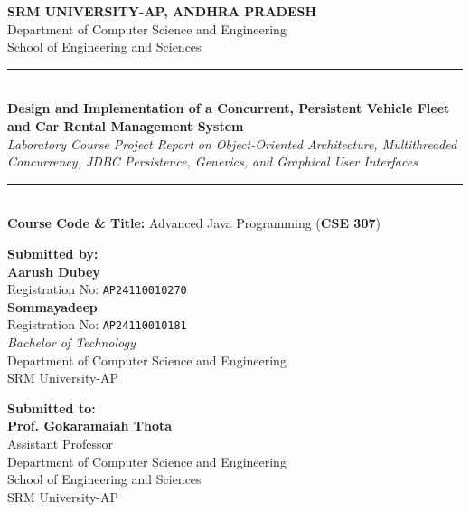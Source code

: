 \documentclass[11pt,a4paper]{article}
\begin{document}
\begin{titlepage}
    \centering
    \vspace*{0.5cm}
    
    {\Large\textbf{SRM UNIVERSITY-AP, ANDHRA PRADESH}}\\[0.25cm]
    {\large Department of Computer Science and Engineering}\\[0.15cm]
    {\small School of Engineering and Sciences}\\[1.2cm]
    
    \rule{\linewidth}{1.2pt}\\[0.4cm]
    {\LARGE\textbf{Design and Implementation of a Concurrent, Persistent Vehicle Fleet and Car Rental Management System}}\\[0.35cm]
    {\large\textit{Laboratory Course Project Report on Object-Oriented Architecture, Multithreaded Concurrency, JDBC Persistence, Generics, and Graphical User Interfaces}}\\[0.2cm]
    \rule{\linewidth}{1.2pt}\\[1.0cm]
    
    \textbf{Course Code \& Title:} Advanced Java Programming (\textbf{CSE 307})\\[1.5cm]
    
    \begin{minipage}{0.48\textwidth}
        \begin{flushleft}
            \textbf{Submitted by:}\\[0.2cm]
            \textbf{Aarush Dubey}\\
            Registration No: \texttt{AP24110010270}\\[0.2cm]
            \textbf{Sommayadeep}\\
            Registration No: \texttt{AP24110010181}\\[0.3cm]
            \textit{Bachelor of Technology}\\
            Department of Computer Science and Engineering\\
            SRM University-AP
        \end{flushleft}
    \end{minipage}
    \hfill
    \begin{minipage}{0.48\textwidth}
        \begin{flushright}
            \textbf{Submitted to:}\\[0.2cm]
            \textbf{Prof. Gokaramaiah Thota}\\
            Assistant Professor\\
            Department of Computer Science and Engineering\\
            School of Engineering and Sciences\\
            SRM University-AP
        \end{flushright}
    \end{minipage}
    
    \vfill
\end{titlepage}
\end{document}
